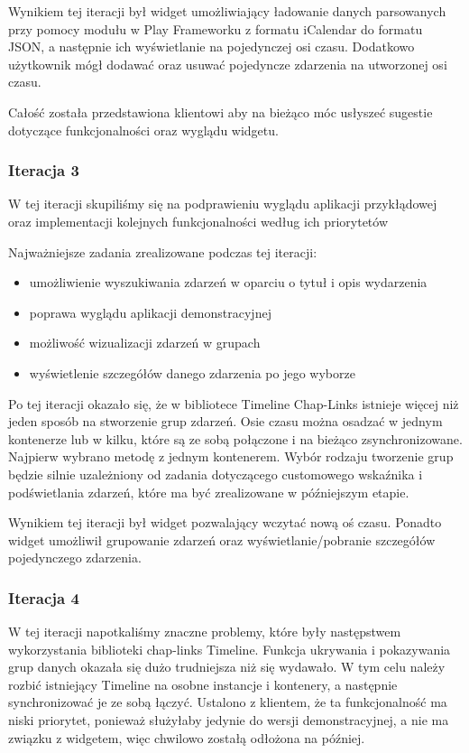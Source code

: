\documentclass[polish,12pt]{aghthesis}
\begin{document}
Wynikiem tej iteracji był widget umożliwiający ładowanie danych parsowanych przy pomocy modułu w Play Frameworku z formatu iCalendar do formatu JSON, a następnie ich wyświetlanie na pojedynczej osi czasu. Dodatkowo użytkownik mógł dodawać oraz usuwać pojedyncze zdarzenia na utworzonej osi czasu.

Całość została przedstawiona klientowi aby na bieżąco móc usłyszeć sugestie dotyczące funkcjonalności oraz wyglądu widgetu.

\subsubsection{Iteracja 3}

W tej iteracji skupiliśmy się na podprawieniu wyglądu aplikacji przykłądowej oraz implementacji kolejnych funkcjonalności według ich priorytetów

Najważniejsze zadania zrealizowane podczas tej iteracji:
\begin{itemize}
	\item umożliwienie wyszukiwania zdarzeń w oparciu o tytuł i opis wydarzenia
	\item poprawa wyglądu aplikacji demonstracyjnej
	\item możliwość wizualizacji zdarzeń w grupach
	\item wyświetlenie szczegółów danego zdarzenia po jego wyborze
\end{itemize}

	Po tej iteracji okazało się, że w bibliotece Timeline Chap-Links istnieje więcej niż jeden sposób na stworzenie grup zdarzeń. Osie czasu można osadzać w jednym kontenerze lub w kilku, które są ze sobą połączone i na bieżąco zsynchronizowane. Najpierw wybrano metodę z jednym kontenerem. Wybór rodzaju tworzenie grup będzie silnie uzależniony od zadania dotyczącego customowego wskaźnika i podświetlania zdarzeń, które ma być zrealizowane w późniejszym etapie.
	
	Wynikiem tej iteracji był widget pozwalający wczytać nową oś czasu. Ponadto widget umożliwił grupowanie zdarzeń oraz wyświetlanie/pobranie szczegółów pojedynczego zdarzenia. 

\subsubsection{Iteracja 4}

W tej iteracji napotkaliśmy znaczne problemy, które były następstwem wykorzystania biblioteki chap-links Timeline. Funkcja ukrywania i pokazywania grup danych okazała się dużo trudniejsza niż się wydawało. W tym celu należy rozbić istniejący Timeline na osobne instancje i kontenery, a następnie synchronizować je ze sobą łączyć. Ustalono z klientem, że ta funkcjonalność ma niski priorytet, ponieważ służyłaby jedynie do wersji demonstracyjnej, a nie ma związku z widgetem, więc chwilowo zostałą odłożona na później.
\end{document}
